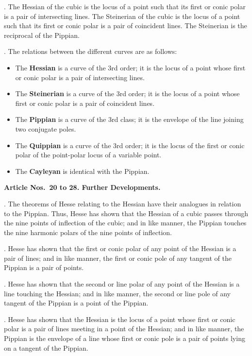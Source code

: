 \documentclass[11pt,a4paper]{book}
\begin{document}
\begin{center}
. The Hessian of the cubic is the locus of a point such
that its first or conic polar is a pair of intersecting lines.
The Steinerian of the cubic is the locus of a point such that
its first or conic polar is a pair of coincident lines. The
Steinerian is the reciprocal of the Pippian.

. The relations between the different curves are as follows:
\begin{itemize}
\item[$\bullet$] The \textbf{Hessian} is a curve of the 3rd order; it is the
locus of a point whose first or conic polar is a pair of intersecting lines.
\item[$\bullet$] The \textbf{Steinerian} is a curve of the 3rd order; it is the
locus of a point whose first or conic polar is a pair of coincident lines.
\item[$\bullet$] The \textbf{Pippian} is a curve of the 3rd class; it is the
envelope of the line joining two conjugate poles.
\item[$\bullet$] The \textbf{Quippian} is a curve of the 3rd order; it is the
locus of the first or conic polar of the point-polar locus of a variable point.
\item[$\bullet$] The \textbf{Cayleyan} is identical with the Pippian.
\end{itemize}

\medskip\noindent\textbf{Article Nos.~20 to 28. Further Developments.}

. The theorems of Hesse relating to the Hessian have
their analogues in relation to the Pippian. Thus, Hesse has
shown that the Hessian of a cubic passes through the nine
points of inflection of the cubic; and in like manner, the Pippian
touches the nine harmonic polars of the nine points of inflection.

. Hesse has shown that the first or conic polar of any
point of the Hessian is a pair of lines; and in like manner,
the first or conic pole of any tangent of the Pippian is a pair
of points.

. Hesse has shown that the second or line polar of any
point of the Hessian is a line touching the Hessian; and in
like manner, the second or line pole of any tangent of the
Pippian is a point of the Pippian.

. Hesse has shown that the Hessian is the locus of a
point whose first or conic polar is a pair of lines meeting in
a point of the Hessian; and in like manner, the Pippian is
the envelope of a line whose first or conic pole is a pair of
points lying on a tangent of the Pippian.


\end{center}
\end{document}
